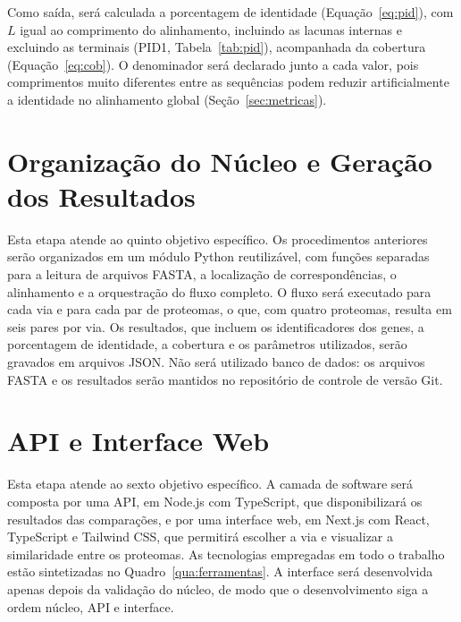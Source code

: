 Como saída, será calculada a porcentagem de identidade (Equação~\ref{eq:pid}), com $L$ igual ao comprimento do alinhamento, incluindo as lacunas internas e excluindo as terminais (PID1, Tabela~\ref{tab:pid}), acompanhada da cobertura (Equação~\ref{eq:cob}). O denominador será declarado junto a cada valor, pois comprimentos muito diferentes entre as sequências podem reduzir artificialmente a identidade no alinhamento global (Seção~\ref{sec:metricas}).

\section{Organização do Núcleo e Geração dos Resultados}

Esta etapa atende ao quinto objetivo específico. Os procedimentos anteriores serão organizados em um módulo Python reutilizável, com funções separadas para a leitura de arquivos FASTA, a localização de correspondências, o alinhamento e a orquestração do fluxo completo. O fluxo será executado para cada via e para cada par de proteomas, o que, com quatro proteomas, resulta em seis pares por via. Os resultados, que incluem os identificadores dos genes, a porcentagem de identidade, a cobertura e os parâmetros utilizados, serão gravados em arquivos JSON. Não será utilizado banco de dados: os arquivos FASTA e os resultados serão mantidos no repositório de controle de versão Git.

\section{API e Interface Web}

Esta etapa atende ao sexto objetivo específico. A camada de software será composta por uma API, em Node.js com TypeScript, que disponibilizará os resultados das comparações, e por uma interface web, em Next.js com React, TypeScript e Tailwind CSS, que permitirá escolher a via e visualizar a similaridade entre os proteomas. As tecnologias empregadas em todo o trabalho estão sintetizadas no Quadro~\ref{qua:ferramentas}. A interface será desenvolvida apenas depois da validação do núcleo, de modo que o desenvolvimento siga a ordem núcleo, API e interface.

